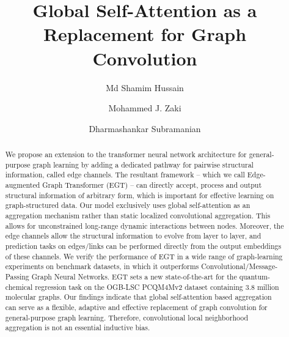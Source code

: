 \documentclass[sigconf,authorversion]{acmart}
\begin{document}
\newcommand{\textbs}[1]{\textcolor{red}{\textbf{#1}}}
\newcommand{\textgd}[1]{\textcolor{violet}{#1}}
\newcommand{\bigparallel}{\bigm\Vert}

\title{Global Self-Attention as a Replacement for Graph Convolution}

\author{Md Shamim Hussain}

\author{Mohammed J. Zaki}

\author{Dharmashankar Subramanian}

\renewcommand{\shortauthors}{Hussain, Zaki and Subramanian}

\begin{abstract}
  We propose an extension to the transformer neural network architecture for general-purpose graph learning by adding a dedicated pathway for pairwise structural information, called edge channels. The resultant framework -- which we call Edge-augmented Graph Transformer (EGT) -- can directly accept, process and output structural information of arbitrary form, which is important for effective learning on graph-structured data. Our model exclusively uses global self-attention as an aggregation mechanism rather than static localized convolutional aggregation. This allows for unconstrained long-range dynamic interactions between nodes. Moreover, the edge channels allow the structural information to evolve from layer to layer, and prediction tasks on edges/links can be performed directly from the output embeddings of these channels. We verify the performance of EGT in a wide range of graph-learning experiments on benchmark datasets, in which it outperforms Convolutional/Message-Passing Graph Neural Networks. EGT sets a new state-of-the-art for the quantum-chemical regression task on the OGB-LSC PCQM4Mv2 dataset containing 3.8 million molecular graphs. Our findings indicate that global self-attention based aggregation can serve as a flexible, adaptive and effective replacement of graph convolution for general-purpose graph learning. Therefore, convolutional local neighborhood aggregation is not an essential inductive bias.
\end{abstract}
\end{document}
